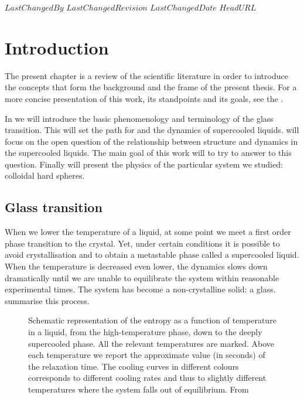 \svnidlong
{$LastChangedBy$}
{$LastChangedRevision$}
{$LastChangedDate$}
{$HeadURL$}

\chapter{Introduction}
\label{ch:intro}

The present chapter is a review of the scientific literature in order to introduce the concepts that form the background and the frame of the present thesis. For a more concise presentation of this work, its standpoints and its goals, see the .

In  we will introduce the basic phenomenology and terminology of the glass transition. This will set the path for  and the dynamics of supercooled liquids.  will focus on the open question of the relationship between structure and dynamics in the supercooled liquids. The main goal of this work will to try to answer to this question. Finally  will present the physics of the particular system we studied: colloidal hard spheres.

\section{Glass transition}
\label{sec:glass_transition}
When we lower the temperature of a liquid, at some point we meet a first order phase transition to the crystal. Yet, under certain conditions it is possible to avoid crystallisation and to obtain a metastable phase called a supercooled liquid. When the temperature is decreased even lower, the dynamics slows down dramatically until we are unable to equilibrate the system within reasonable experimental times. The system has become a non-crystalline solid: a glass.  summarise this process.

\begin{figure}
	\centering
	\def\svgwidth{0.8\textwidth}
   	
	\caption{Schematic representation of the entropy as a function of temperature in a liquid, from the high-temperature phase, down to the deeply supercooled phase. All the relevant temperatures are marked. Above each temperature we report the approximate value (in seconds) of the relaxation time. The cooling curves in different colours corresponds to different cooling rates and thus to slightly different temperatures where the system falls out of equilibrium.
	From }
	\label{fig:cooling}
\end{figure}


